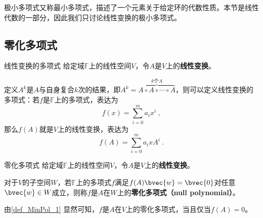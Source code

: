 



极小多项式又称最小多项式，描述了一个元素关于给定环的代数性质。本节是线性代数的一部分，因此我们只讨论线性变换的极小多项式。


\subsection{零化多项式}





\begin{definition}{线性变换的多项式}
给定域$\mathbb{F}$上的线性空间$V$，令$A$是$V$上的\textbf{线性变换}。

定义$A^k$是$A$与自身复合$k$次的结果，即$A^k=\overbrace{A\circ A\circ\cdots\circ A}^{k\text{个}A}$，则可以定义线性变换的多项式：若$f$是$\mathbb{F}$上的多项式，表达为
\begin{equation}
f(x) = \sum_{i=0}^m a_ix^i~, 
\end{equation}
那么$f(A)$就是$V$上的线性变换，表达为
\begin{equation}
f(A) = \sum_{i=0}^m a_ixA^i~. 
\end{equation}
\end{definition}



\begin{definition}{零化多项式}\label{def_MinPol_1}
给定域$\mathbb{F}$上的线性空间$V$，令$A$是$V$上的\textbf{线性变换}。

对于$V$的子空间$W$，若$\mathbb{F}$上的多项式$f$满足$f(A)\bvec{w}=\bvec{0}$对任意$\bvec{w}\in W$成立，则称$f$是$A$在$W$上的\textbf{零化多项式（null polynomial）}。
\end{definition}


由\autoref{def_MinPol_1} 显然可知，$f$是$A$在$V$上的零化多项式，当且仅当$f(A)=0$。




























